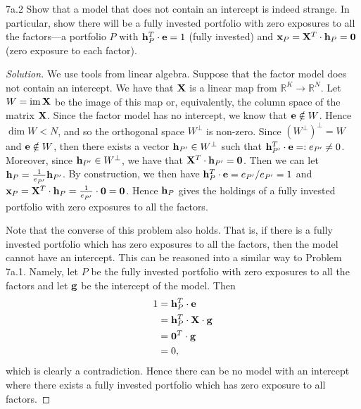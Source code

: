 \begin{problem}{7a.2}
Show that a model that does not contain an intercept is indeed strange. In particular, show there will be a fully invested portfolio with zero exposures to all the factors---a portfolio $P$ with $\mathbf{h}_{P}^{T} \cdot \mathbf{e} = 1$ (fully invested) and $\mathbf{x}_P = \mathbf{X}^T \cdot \mathbf{h}_P = \mathbf{0}$ (zero exposure to each factor).
\end{problem}
\begin{proof}[Solution]
We use tools from linear algebra. Suppose that the factor model does not contain an intercept. We have that $\mathbf{X}$ is a linear map from $\mathbb{R}^{K} \to \mathbb{R}^{N}$. Let $W = \operatorname{im}\mathbf{X}$ be the image of this map or, equivalently, the column space of the matrix $\mathbf{X}$. Since the factor model has no intercept, we know that $\mathbf{e} \notin W$. Hence $\dim W < N$, and so the orthogonal space $W^{\perp}$ is non-zero. Since $(W^{\perp})^{\perp} = W$ and $\mathbf{e} \notin W$, then there exists a vector $\mathbf{h}_{P'} \in W^{\perp}$ such that $\mathbf{h}_{P'}^{T} \cdot \mathbf{e} =: e_{P'} \neq 0$. Moreover, since $\mathbf{h}_{P'} \in W^{\perp}$, we have that $\mathbf{X}^{T} \cdot \mathbf{h}_{P'} = \mathbf{0}$. Then we can let $\mathbf{h}_{P} = \frac{1}{e_{P'}}\mathbf{h}_{P'}$. By construction, we then have $\mathbf{h}_{P}^{T} \cdot \mathbf{e} = e_{P'}/e_{P'} = 1$ and $\mathbf{x}_{P} = \mathbf{X}^{T} \cdot \mathbf{h}_{P} = \frac{1}{e_{P'}} \cdot \mathbf{0} = \mathbf{0}$. Hence $\mathbf{h}_{P}$ gives the holdings of a fully invested portfolio with zero exposures to all the factors.

Note that the converse of this problem also holds. That is, if there is a fully invested portfolio which has zero exposures to all the factors, then the model cannot have an intercept. This can be reasoned into a similar way to Problem 7a.1. Namely, let $P$ be the fully invested portfolio with zero exposures to all the factors and let $\mathbf{g}$ be the intercept of the model. Then
\begin{align*}
1 &= \mathbf{h}_{P}^{T} \cdot \mathbf{e}\\
&= \mathbf{h}_{P}^{T} \cdot \mathbf{X} \cdot \mathbf{g}\\
&= \mathbf{0}^{T} \cdot \mathbf{g}\\
&= 0,
\end{align*}
which is clearly a contradiction. Hence there can be no model with an intercept where there exists a fully invested portfolio which has zero exposure to all factors.
\end{proof}

